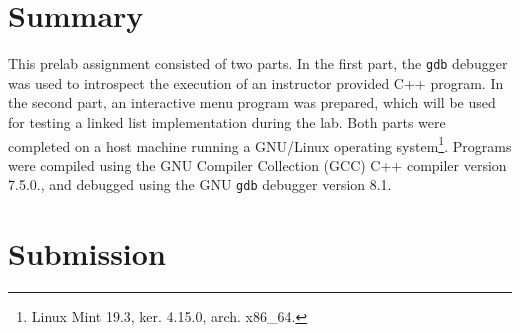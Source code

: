 \documentclass[11pt, letterpaper]{article} %
\begin{document}
  \makelabtitle
  
\section*{Summary}

This prelab assignment consisted of two parts. In the first part, the \texttt{gdb} debugger was used to introspect the execution of an instructor provided C++ program. In the second part, an interactive menu program was prepared, which will be used for testing a linked list implementation during the lab. Both parts were completed on a host machine running a GNU/Linux operating system\footnote{Linux Mint 19.3, ker. 4.15.0, arch. x86\_64.}. Programs were compiled using the GNU Compiler Collection (GCC) C++ compiler version 7.5.0., and debugged using the GNU \texttt{gdb} debugger version 8.1.

\section*{Submission}
\end{document}
